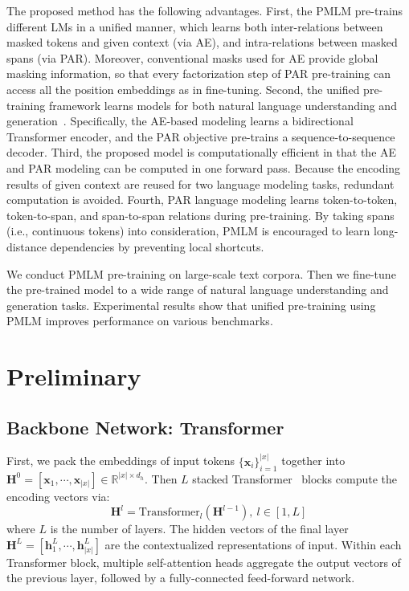 \documentclass{article}
\newcommand\pmlm{\textsc{PMLM}}
\begin{document}
The proposed method has the following advantages.
First, the \pmlm{} pre-trains different LMs in a unified manner, which learns both inter-relations between masked tokens and given context (via AE), and intra-relations between masked spans (via PAR).
Moreover, conventional masks used for AE provide global masking information, so that every factorization step of PAR pre-training can access all the position embeddings as in fine-tuning.
Second, the unified pre-training framework learns models for both natural language understanding and generation~\cite{unilm}.
Specifically, the AE-based modeling learns a bidirectional Transformer encoder, and the PAR objective pre-trains a sequence-to-sequence decoder.
Third, the proposed model is computationally efficient in that the AE and PAR modeling can be computed in one forward pass.
Because the encoding results of given context are reused for two language modeling tasks, redundant computation is avoided.
Fourth, PAR language modeling learns token-to-token, token-to-span, and span-to-span relations during pre-training.
By taking spans (i.e., continuous tokens) into consideration, \pmlm{} is encouraged to learn long-distance dependencies by preventing local shortcuts.

We conduct \pmlm{} pre-training on large-scale text corpora.
Then we fine-tune the pre-trained model to a wide range of natural language understanding and generation tasks.
Experimental results show that unified pre-training using \pmlm{} improves performance on various benchmarks.


\section{Preliminary}

\subsection{Backbone Network: Transformer}
\label{sec:transformer}

First, we pack the embeddings of input tokens $\{\textbf{x}_i\}_{i=1}^{|x|}$ together into $\mathbf{H}^0 = [\mathbf{x}_1, \cdots, \mathbf{x}_{|x|}] \in \mathbb{R}^{|x| \times d_h}$.
Then $L$ stacked Transformer~\cite{transformer} blocks compute the encoding vectors via:
\begin{equation}
\mathbf{H}^l = \mathrm{Transformer}_{l}(\mathbf{H}^{l-1}),~l \in [1, L]
\end{equation}
where $L$ is the number of layers.
The hidden vectors of the final layer $\mathbf{H}^L = [\mathbf{h}_1^L, \cdots, \mathbf{h}_{|x|}^L]$ are the contextualized representations of input.
Within each Transformer block, multiple self-attention heads aggregate the output vectors of the previous layer, followed by a fully-connected feed-forward network.
\end{document}
